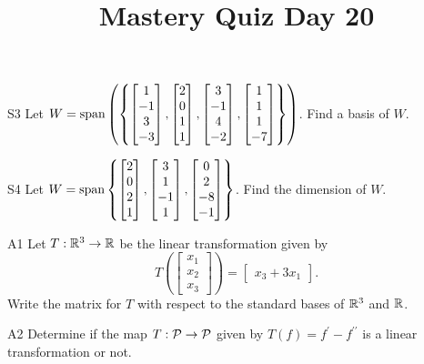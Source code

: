 \documentclass{sbgLAquiz}
\title{Mastery Quiz Day 20 }
\begin{document}
\begin{problem}{S3}
Let $W={\rm span}\left( \left\{ \begin{bmatrix} 1 \\ -1 \\ 3 \\ -3 \end{bmatrix},\begin{bmatrix} 2 \\ 0 \\ 1 \\ 1 \end{bmatrix}, \begin{bmatrix} 3 \\ -1 \\ 4 \\ -2 \end{bmatrix},  \begin{bmatrix} 1 \\ 1 \\ 1 \\ -7 \end{bmatrix} \right\}\right)$.  Find a basis of $W$.
\end{problem}

\begin{problem}{S4}
Let \(
  W={\rm span}\left\{
    \begin{bmatrix} 2 \\ 0 \\ 2 \\ 1 \end{bmatrix},
    \begin{bmatrix} 3 \\ 1 \\ -1 \\ 1 \end{bmatrix},
    \begin{bmatrix} 0 \\ 2 \\ -8 \\ -1 \end{bmatrix}
  \right\}
\). Find the dimension of \(W\).
\end{problem}
\newpage

\begin{problem}{A1}
Let $T: \IR^3 \rightarrow \IR$ be the linear transformation given by $$T\left(\begin{bmatrix} x_1 \\ x_2 \\ x_3  \end{bmatrix} \right) = \begin{bmatrix} x_3+3x_1 \end{bmatrix}.$$ Write the matrix for $T$ with respect to the standard bases of $\IR^3$ and $\IR$.
\end{problem}

\begin{problem}{A2}
Determine if the map $T: \P  \rightarrow \P$ given by $T(f) = f^{\prime}-f^{\prime \prime}$ is a linear transformation or not.
\end{problem}
\end{document}
